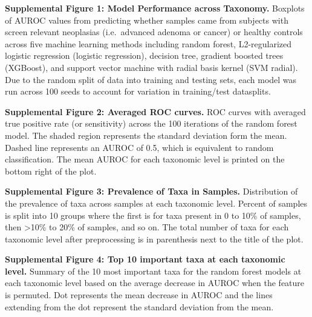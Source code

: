 \documentclass[
]{article}
\begin{document}
\textbf{Supplemental Figure 1: Model Performance across Taxonomy.}
Boxplots of AUROC values from predicting whether samples came from
subjects with screen relevant neoplasias (i.e.~advanced adenoma or
cancer) or healthy controls across five machine learning methods
including random forest, L2-regularized logistic regression (logistic
regression), decision tree, gradient boosted trees (XGBoost), and
support vector machine with radial basis kernel (SVM radial). Due to the
random split of data into training and testing sets, each model was run
across 100 seeds to account for variation in training/test datasplits.

\textbf{Supplemental Figure 2: Averaged ROC curves.} ROC curves with
averaged true positive rate (or sensitivity) across the 100 iterations
of the random forest model. The shaded region represents the standard
deviation form the mean. Dashed line represents an AUROC of 0.5, which
is equivalent to random classification. The mean AUROC for each
taxonomic level is printed on the bottom right of the plot.

\textbf{Supplemental Figure 3: Prevalence of Taxa in Samples.}
Distribution of the prevalence of taxa across samples at each taxonomic
level. Percent of samples is split into 10 groups where the first is for
taxa present in 0 to 10\% of samples, then \textgreater10\% to 20\% of
samples, and so on. The total number of taxa for each taxonomic level
after preprocessing is in parenthesis next to the title of the plot.

\textbf{Supplemental Figure 4: Top 10 important taxa at each taxonomic
level.} Summary of the 10 most important taxa for the random forest
models at each taxonomic level based on the average decrease in AUROC
when the feature is permuted. Dot represents the mean decrease in AUROC
and the lines extending from the dot represent the standard deviation
from the mean.
\end{document}
